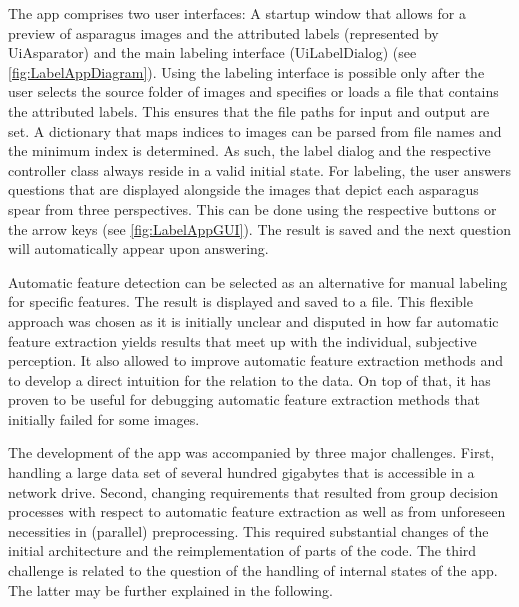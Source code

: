 The app comprises two user interfaces: A startup window that allows for a preview of asparagus images and the attributed labels (represented by Ui\textunderscore Asparator) and the main labeling interface (Ui\textunderscore LabelDialog) (see \autoref{fig:LabelAppDiagram}). Using the labeling interface is possible only after the user selects the source folder of images and specifies or loads a file that contains the attributed labels. This ensures that the file paths for input and output are set. A dictionary that maps indices to images can be parsed from file names and the minimum index is determined. As such, the label dialog and the respective controller class always reside in a valid initial state. For labeling, the user answers questions that are displayed alongside the images that depict each asparagus spear from three perspectives. This can be done using the respective buttons or the arrow keys (see \autoref{fig:LabelAppGUI}). The result is saved and the next question will automatically appear upon answering. 

Automatic feature detection can be selected as an alternative for manual labeling for specific features. The result is displayed and saved to a file. This flexible approach was chosen as it is initially unclear and disputed in how far automatic feature extraction yields results that meet up with the individual, subjective perception. It also allowed to improve automatic feature extraction methods and to develop a direct intuition for the relation to the data. On top of that, it has proven to be useful for debugging automatic feature extraction methods that initially failed for some images.

\bigskip
The development of the app was accompanied by three major challenges. First, handling a large data set of several hundred gigabytes that is accessible in a network drive. Second, changing requirements that resulted from group decision processes with respect to automatic feature extraction as well as from unforeseen necessities in (parallel) preprocessing. This required substantial changes of the initial architecture and the reimplementation of parts of the code. The third challenge is related to the question of the handling of internal states of the app. The latter may be further explained in the following. 

